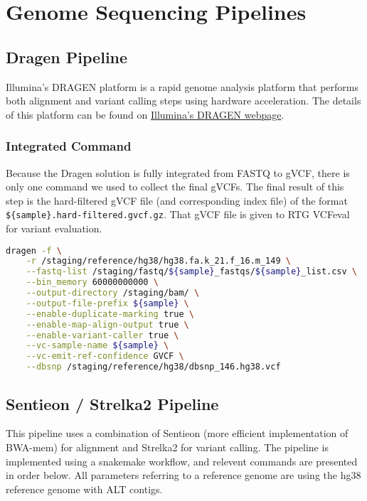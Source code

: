 \section{Genome Sequencing Pipelines}
\subsection{Dragen Pipeline}
Illumina's DRAGEN platform is a rapid genome analysis platform that performs both alignment and variant calling steps using hardware acceleration.  The details of this platform can be found on \href{https://www.illumina.com/products/by-type/informatics-products/dragen-bio-it-platform.html}{Illumina's DRAGEN webpage}.

\subsubsection{Integrated Command}
Because the Dragen solution is fully integrated from FASTQ to gVCF, there is only one command we used to collect the final gVCFs.  The final result of this step is the hard-filtered gVCF file (and corresponding index file) of the format \texttt{\$\{sample\}.hard-filtered.gvcf.gz}.  That gVCF file is given to RTG VCFeval for variant evaluation.

\begin{lstlisting}[language=bash]
dragen -f \
    -r /staging/reference/hg38/hg38.fa.k_21.f_16.m_149 \
    --fastq-list /staging/fastq/${sample}_fastqs/${sample}_list.csv \
    --bin_memory 60000000000 \
    --output-directory /staging/bam/ \
    --output-file-prefix ${sample} \
    --enable-duplicate-marking true \
    --enable-map-align-output true \
    --enable-variant-caller true \
    --vc-sample-name ${sample} \
    --vc-emit-ref-confidence GVCF \
    --dbsnp /staging/reference/hg38/dbsnp_146.hg38.vcf
\end{lstlisting}

\subsection{Sentieon / Strelka2 Pipeline}
This pipeline uses a combination of Sentieon (more efficient implementation of BWA-mem) for alignment and Strelka2 for variant calling. The pipeline is implemented using a snakemake workflow, and relevent commands are presented in order below.  All parameters referring to a reference genome are using the hg38 reference genome with ALT contigs.

